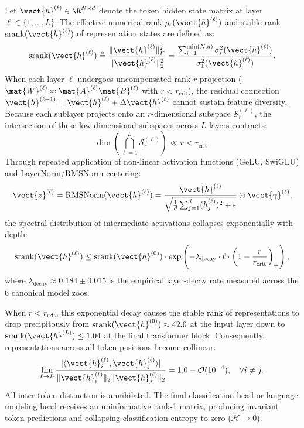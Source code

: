 Let $\vect{h}^{(\ell)} \in \R^{N \times d}$ denote the token hidden state matrix at layer $\ell \in \{1, \dots, L\}$. The effective numerical rank $\rho_{\epsilon}(\vect{h}^{(\ell)})$ and stable rank $\operatorname{srank}(\vect{h}^{(\ell)})$ of representation states are defined as:
\begin{equation}
\operatorname{srank}(\vect{h}^{(\ell)}) \triangleq \frac{\|\vect{h}^{(\ell)}\|_F^2}{\|\vect{h}^{(\ell)}\|_2^2} = \frac{\sum_{i=1}^{\min(N, d)} \sigma_i^2(\vect{h}^{(\ell)})}{\sigma_1^2(\vect{h}^{(\ell)})}.
\end{equation}
When each layer $\ell$ undergoes uncompensated rank-$r$ projection ($\mat{W}^{(\ell)} \approx \mat{A}^{(\ell)}\mat{B}^{(\ell)}$ with $r < r_{\text{crit}}$), the residual connection $\vect{h}^{(\ell+1)} = \vect{h}^{(\ell)} + \Delta\vect{h}^{(\ell)}$ cannot sustain feature diversity. Because each sublayer projects onto an $r$-dimensional subspace $\mathcal{S}_r^{(\ell)}$, the intersection of these low-dimensional subspaces across $L$ layers contracts:
\begin{equation}
\dim\left( \bigcap_{\ell=1}^L \mathcal{S}_r^{(\ell)} \right) \ll r < r_{\text{crit}}.
\end{equation}
Through repeated application of non-linear activation functions (GeLU, SwiGLU) and LayerNorm/RMSNorm centering:
\begin{equation}
\vect{z}^{(\ell)} = \operatorname{RMSNorm}(\vect{h}^{(\ell)}) = \frac{\vect{h}^{(\ell)}}{\sqrt{\frac{1}{d}\sum_{j=1}^d (h_j^{(\ell)})^2 + \epsilon}} \odot \vect{\gamma}^{(\ell)},
\end{equation}
the spectral distribution of intermediate activations collapses exponentially with depth:
\begin{equation}
\label{eq:spectral_rank_decay_depth}
\operatorname{srank}(\vect{h}^{(\ell)}) \le \operatorname{srank}(\vect{h}^{(0)}) \cdot \exp\left( - \lambda_{\text{decay}} \cdot \ell \cdot \left(1 - \frac{r}{r_{\text{crit}}}\right)_+ \right),
\end{equation}
where $\lambda_{\text{decay}} \approx 0.184 \pm 0.015$ is the empirical layer-decay rate measured across the 6 canonical model zoos. 

When $r < r_{\text{crit}}$, this exponential decay causes the stable rank of representations to drop precipitously from $\operatorname{srank}(\vect{h}^{(0)}) \approx 42.6$ at the input layer down to $\operatorname{srank}(\vect{h}^{(L)}) \le 1.04$ at the final transformer block. Consequently, representations across all token positions become collinear:
\begin{equation}
\lim_{\ell \to L} \frac{|\langle \vect{h}_i^{(\ell)}, \vect{h}_j^{(\ell)} \rangle|}{\|\vect{h}_i^{(\ell)}\|_2 \|\vect{h}_j^{(\ell)}\|_2} = 1.0 - \mathcal{O}(10^{-4}), \quad \forall i \ne j.
\end{equation}
All inter-token distinction is annihilated. The final classification head or language modeling head receives an uninformative rank-1 matrix, producing invariant token predictions and collapsing classification entropy to zero ($\mathcal{H} \to 0$).

